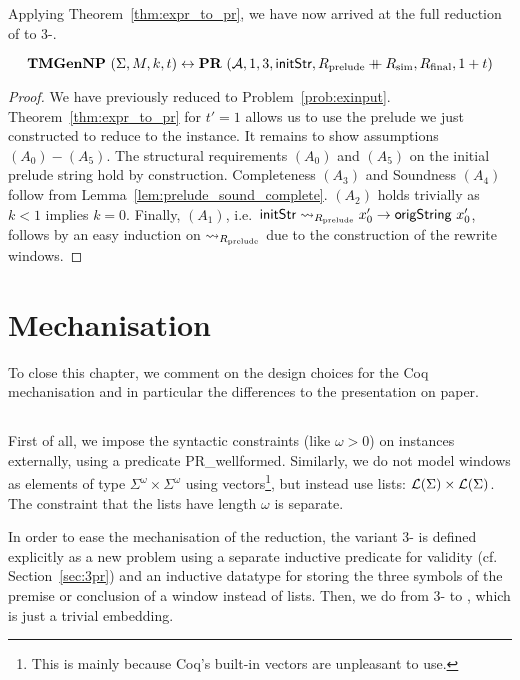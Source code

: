Applying Theorem~\ref{thm:expr_to_pr}, we have now arrived at the full reduction of \gennp{} to 3-\PR{}.

\begin{theorem}
  \[\textbf{TMGenNP}~(\Sigma, M, k, t) \leftrightarrow \textbf{PR}~(\mathcal{A}, 1, 3, \textsf{initStr}, R_{\text{prelude}} \mathbin{+\mkern-10mu+} R_{\text{sim}}, R_{\text{final}}, 1 + t) \]
\end{theorem}
\begin{proof}
  We have previously reduced \gennp{} to Problem~\ref{prob:exinput}. Theorem~\ref{thm:expr_to_pr} for $t' = 1$ allows us to use the prelude we just constructed to reduce to the \PR{} instance.
  It remains to show assumptions $(A_0) - (A_5)$. 
  The structural requirements $(A_0)$ and $(A_5)$ on the initial prelude string hold by construction. 
  Completeness $(A_3)$ and Soundness $(A_4)$ follow from Lemma~\ref{lem:prelude_sound_complete}. 
  $(A_2)$ holds trivially as $k < 1$ implies $k = 0$. Finally, $(A_1)$, i.e.\ $\textsf{initStr} \rightsquigarrow_{R_{\text{prelude}}} x_0' \rightarrow \textsf{origString}~x_0'$, follows by an easy induction on $\rightsquigarrow_{R_{\text{prelude}}}$ due to the construction of the rewrite windows. 
\end{proof}

\section{Mechanisation}
To close this chapter, we comment on the design choices for the Coq mechanisation and in particular the differences to the presentation on paper. 

\subsection{\PR{}}
First of all, we impose the syntactic constraints (like $\omega > 0$) on \PR{} instances externally, using a predicate \textsf{PR\_wellformed}. 
Similarly, we do not model windows as elements of type $\Sigma^\omega \times \Sigma^\omega$ using vectors\footnote{This is mainly because Coq's built-in vectors are unpleasant to use.}, but instead use lists: $\mathcal{L} (\Sigma) \times \mathcal{L} (\Sigma)$. The constraint that the lists have length $\omega$ is separate.

In order to ease the mechanisation of the reduction, the variant 3-\PR{} is defined explicitly as a new problem using a separate inductive predicate for validity (cf. Section~\ref{sec:3pr}) and an inductive datatype for storing the three symbols of the premise or conclusion of a window instead of lists.
%
Then, we do  from 3-\PR{} to \PR{}, which is just a trivial embedding.

